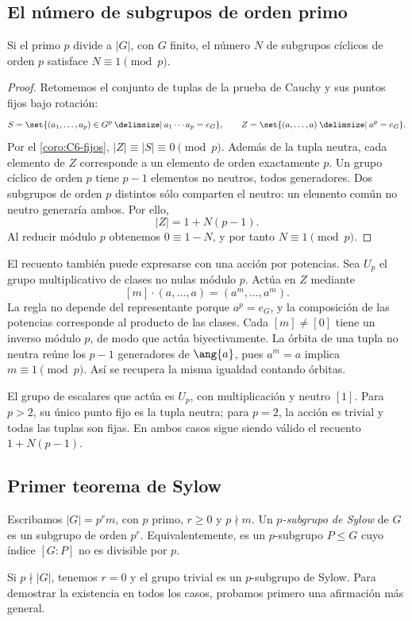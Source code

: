 \subsection{El número de subgrupos de orden primo}\label{tema:7-1-1}
\begin{prop}\label{prop:C7-orden-primo}
Si el primo $p$ divide a $|G|$, con $G$ finito, el número $N$ de subgrupos cíclicos de orden $p$ satisface $N\equiv1\pmod p$.
\end{prop}
\begin{proof}
Retomemos el conjunto de tuplas de la prueba de Cauchy y sus puntos fijos bajo rotación:
\[
S=\set{(a_1,\ldots,a_p)\in G^p\given a_1\cdots a_p=e_G},\qquad
Z=\set{(a,\ldots,a)\given a^p=e_G}.
\]
Por el \cref{coro:C6-fijos}, $|Z|\equiv|S|\equiv0\pmod p$. Además de la tupla neutra, cada elemento de $Z$ corresponde a un elemento de orden exactamente $p$. Un grupo cíclico de orden $p$ tiene $p-1$ elementos no neutros, todos generadores. Dos subgrupos de orden $p$ distintos sólo comparten el neutro: un elemento común no neutro generaría ambos. Por ello,
\[
|Z|=1+N(p-1).
\]
Al reducir módulo $p$ obtenemos $0\equiv1-N$, y por tanto $N\equiv1\pmod p$.
\end{proof}
El recuento también puede expresarse con una acción por potencias. Sea $U_p$ el grupo multiplicativo de clases no nulas módulo $p$. Actúa en $Z$ mediante
\[
[m]\cdot(a,\ldots,a)=(a^m,\ldots,a^m).
\]
La regla no depende del representante porque $a^p=e_G$, y la composición de las potencias corresponde al producto de las clases. Cada $[m]\ne[0]$ tiene un inverso módulo $p$, de modo que actúa biyectivamente. La órbita de una tupla no neutra reúne los $p-1$ generadores de $\ang{a}$, pues $a^m=a$ implica $m\equiv1\pmod p$. Así se recupera la misma igualdad contando órbitas.
\begin{obs}
El grupo de escalares que actúa es $U_p$, con multiplicación y neutro $[1]$. Para $p>2$, su único punto fijo es la tupla neutra; para $p=2$, la acción es trivial y todas las tuplas son fijas. En ambos casos sigue siendo válido el recuento $1+N(p-1)$.
\end{obs}

\subsection{Primer teorema de Sylow}\label{tema:7-1-2}
\begin{defi}
Escribamos $|G|=p^r m$, con $p$ primo, $r\ge0$ y $p\nmid m$. Un \emph{$p$-subgrupo de Sylow} de $G$ es un subgrupo de orden $p^r$. Equivalentemente, es un $p$-subgrupo $P\le G$ cuyo índice $[G:P]$ no es divisible por $p$.
\end{defi}
Si $p\nmid|G|$, tenemos $r=0$ y el grupo trivial es un $p$-subgrupo de Sylow. Para demostrar la existencia en todos los casos, probamos primero una afirmación más general.

